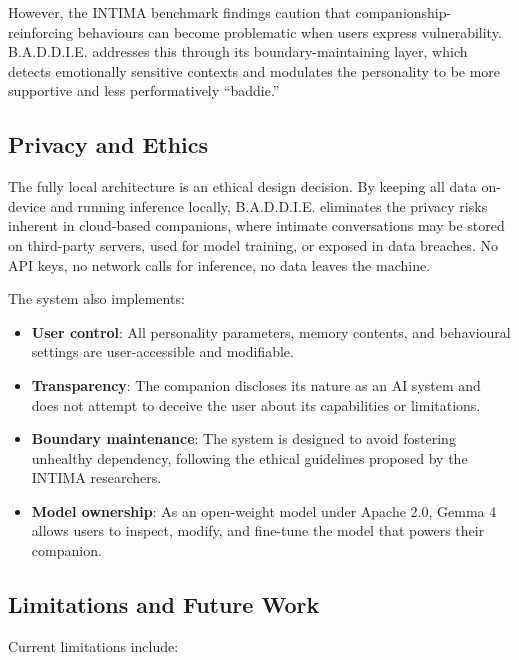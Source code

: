 \documentclass[sigconf]{acmart}
\begin{document}
However, the INTIMA benchmark findings \cite{arxiv2508.09998} caution that companionship-reinforcing behaviours can become problematic when users express vulnerability. B.A.D.D.I.E. addresses this through its boundary-maintaining layer, which detects emotionally sensitive contexts and modulates the personality to be more supportive and less performatively ``baddie.''

\subsection{Privacy and Ethics}

The fully local architecture is an ethical design decision. By keeping all data on-device and running inference locally, B.A.D.D.I.E. eliminates the privacy risks inherent in cloud-based companions, where intimate conversations may be stored on third-party servers, used for model training, or exposed in data breaches. No API keys, no network calls for inference, no data leaves the machine.

The system also implements:
\begin{itemize}
    \item \textbf{User control}: All personality parameters, memory contents, and behavioural settings are user-accessible and modifiable.
    \item \textbf{Transparency}: The companion discloses its nature as an AI system and does not attempt to deceive the user about its capabilities or limitations.
    \item \textbf{Boundary maintenance}: The system is designed to avoid fostering unhealthy dependency, following the ethical guidelines proposed by the INTIMA researchers.
    \item \textbf{Model ownership}: As an open-weight model under Apache 2.0, Gemma 4 allows users to inspect, modify, and fine-tune the model that powers their companion.
\end{itemize}

\subsection{Limitations and Future Work}

Current limitations include:
\end{document}
